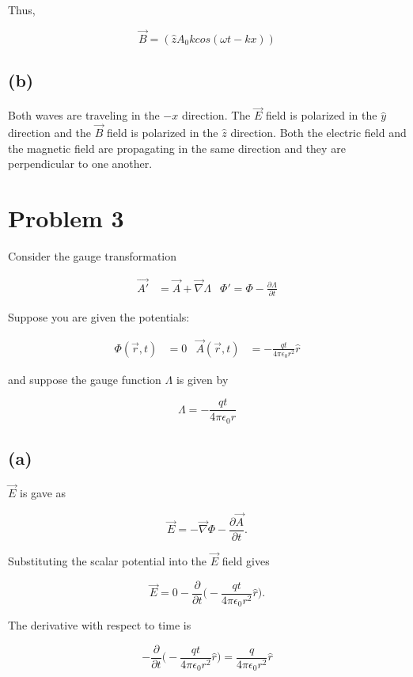 \documentclass[11pt]{article}
\begin{document}
Thus,

$$
\Vec{B} = (\hat{z}A_{0}k cos(\omega t - kx))
$$

\subsection*{(b)}

Both waves are traveling in the $-x$ direction. The $\vec{E}$ field is polarized in the $\hat{y}$ direction and the $\vec{B}$ field is polarized in the $\hat{z}$ direction. Both the electric field and the magnetic field are propagating in the same direction and they are perpendicular to one another. 

\clearpage

\section*{Problem 3}

Consider the gauge transformation

\begin{align*}
    \vec{A'} &= \vec{A} + \vec{\nabla}\Lambda & \Phi' = \Phi - \frac{\partial \Lambda}{\partial t}
\end{align*}

Suppose you are given the potentials:

\begin{align*}
    \Phi(\vec{r}, t) &= 0 & \vec{A}(\vec{r}, t) &= -\frac{qt}{4\pi\epsilon_{0}r^{2}}\hat{r}
\end{align*}

and suppose the gauge function $\Lambda$ is given by

$$
\Lambda = -\frac{qt}{4\pi\epsilon_{0}r}
$$

\subsection*{(a)}

$\Vec{E}$ is gave as 

$$
\Vec{E} = -\Vec{\nabla} \Phi - \frac{\partial \vec{A}}{\partial t}.
$$

Substituting the scalar potential into the $\Vec{E}$ field gives

$$
\Vec{E} = 0 - \frac{\partial}{\partial t} \Bigg(-\frac{qt}{4\pi\epsilon_{0}r^{2}}\hat{r}\Bigg).
$$

The derivative with respect to time is 

$$
- \frac{\partial}{\partial t} \Bigg(-\frac{qt}{4\pi\epsilon_{0}r^{2}}\hat{r}\Bigg) = \frac{q}{4\pi\epsilon_{0}r^{2}}\hat{r} 
$$
\end{document}
